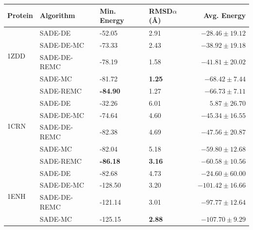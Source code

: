 \begin{table}[ht!]
  \centering
  \begin{tabular}{ l | l | l | l | r }
    \hline \hline
Protein               & Algorithm    & Min. Energy      & RMSD$\alpha$ ({\AA}) & Avg. Energy                \\ \hline \hline
\multirow{4}{*}{1ZDD} & SADE-DE      & -52.05           & 2.91                 & $ -28.46 \pm 19.12       $ \\ \cline{2-5}
                      & SADE-DE-MC   & -73.33           & 2.43                 & $ -38.92 \pm 19.18       $ \\ \cline{2-5}
                      & SADE-DE-REMC & -78.19           & 1.58                 & $ -41.81 \pm 20.02       $ \\ \cline{2-5}
                      & SADE-MC      & -81.72           & \textbf{1.25}        & $ \bm{-68.42 \pm 7.44}   $ \\ \cline{2-5}
                      & SADE-REMC    & \textbf{-84.90}  & 1.27                 & $ -66.73 \pm 7.11        $ \\ \hline \hline
\multirow{4}{*}{1CRN} & SADE-DE      & -32.26           & 6.01                 & $ 5.87 \pm 26.70         $ \\ \cline{2-5}
                      & SADE-DE-MC   & -74.64           & 4.60                 & $ -45.34 \pm 16.55       $ \\ \cline{2-5}
                      & SADE-DE-REMC & -82.38           & 4.69                 & $ -47.56 \pm 20.87       $ \\ \cline{2-5}
                      & SADE-MC      & -82.04           & 5.18                 & $ -59.80 \pm 12.68       $ \\ \cline{2-5}
                      & SADE-REMC    & \textbf{-86.18}  & \textbf{3.16}        & $ \bm{-60.58 \pm 10.56}  $ \\ \hline \hline
\multirow{4}{*}{1ENH} & SADE-DE      & -82.68           & 4.73                 & $ -24.60 \pm 60.00       $ \\ \cline{2-5}
                      & SADE-DE-MC   & -128.50          & 3.20                 & $ -101.42 \pm 16.66      $ \\ \cline{2-5}
                      & SADE-DE-REMC & -121.14          & 3.01                 & $ -97.77 \pm 12.64       $ \\ \cline{2-5}
                      & SADE-MC      & -125.15          & \textbf{2.88}        & $ \bm{-107.70 \pm 9.29}  $ \\ \cline{2-5}

\end{tabular}
\end{table}
